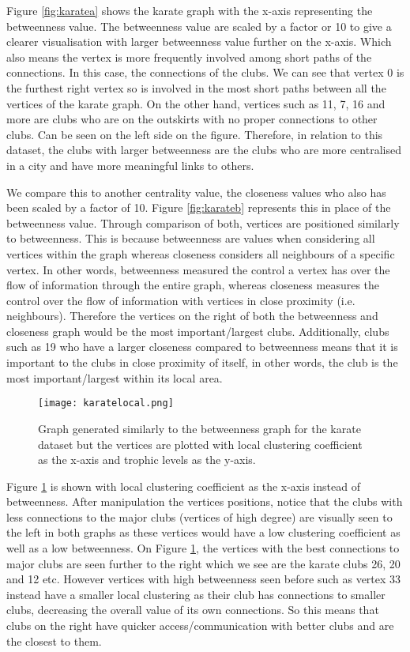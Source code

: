 Figure \ref{fig:karatea} shows the karate graph with the x-axis representing the betweenness value. The betweenness value are scaled by a factor or 10 to give a clearer visualisation with larger betweenness value further on the x-axis. Which also means the vertex is more frequently involved among short paths of the connections. In this case, the connections of the clubs. We can see that vertex 0 is the furthest right vertex so is involved in the most short paths between all the vertices of the karate graph. On the other hand, vertices such as 11, 7, 16 and more are clubs who are on the outskirts with no proper connections to other clubs. Can be seen on the left side on the figure. Therefore, in relation to this dataset, the clubs with larger betweenness are the clubs who are more centralised in a city and have more meaningful links to others.

We compare this to another centrality value, the closeness values who also has been scaled by a factor of 10. Figure \ref{fig:karateb} represents this in place of the betweenness value. Through comparison of both, vertices are positioned similarly to betweenness. This is because betweenness are values when considering all vertices within the graph whereas closeness considers all neighbours of a specific vertex. In other words, betweenness measured the control a vertex has over the flow of information through the entire graph, whereas closeness measures the control over the flow of information with vertices in close proximity (i.e. neighbours). Therefore the vertices on the right of both the betweenness and closeness graph would be the most important/largest clubs. Additionally, clubs such as 19 who have a larger closeness compared to betweenness means that it is important to the clubs in close proximity of itself, in other words, the club is the most important/largest within its local area.

\begin{figure}[H]
	\centering
	\texttt{[image: karatelocal.png]}
	\caption{Graph generated similarly to the betweenness graph for the karate dataset but the vertices are plotted with local clustering coefficient as the x-axis and trophic levels as the y-axis.}
	\label{fig:karatelocal}
\end{figure}


Figure \ref{fig:karatelocal} is shown with local clustering coefficient as the x-axis instead of betweenness. After manipulation the vertices positions, notice that the clubs with less connections to the major clubs (vertices of high degree) are visually seen to the left in both graphs as these vertices would have a low clustering coefficient as well as a low betweenness. On Figure \ref{fig:karatelocal}, the vertices with the best connections to major clubs are seen further to the right which we see are the karate clubs 26, 20 and 12 etc. However vertices with high betweenness seen before such as vertex 33 instead have a smaller local clustering as their club has connections to smaller clubs, decreasing the overall value of its own connections. So this means that clubs on the right have quicker access/communication with better clubs and are the closest to them.

